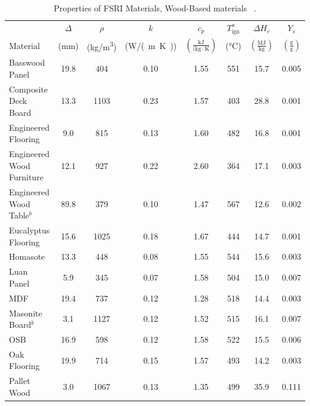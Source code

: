 \clearpage

\begin{table}[!h]
\caption[Properties of FSRI Materials, Wood-Based materials]{Properties of FSRI Materials, Wood-Based materials ~\cite{McKinnon:FSRI2023_Data}.}
\centering
\begin{tabular}{|p{4.5cm}|c|c|c|c|c|c|c|}
\hline
            & $\Delta$& $\rho$& $k$& $c_{p}$ &$T_{\mathrm{ign}}^{a}$&$\Delta H_{c}$& $Y_{s}$ \\
Material    & (mm) & (\unit{kg/m^3}) & (\unit{W/(m.K)}) & $\mathrm{\left(\frac{kJ}{(kg\cdot K}\right)}$ & (\unit{\degreeCelsius})   & $\left(\mathrm{\frac{MJ}{kg}}\right)$ & $\mathrm{\left(\frac{g}{g}\right)}$ \\ \hline
\hline
Basswood Panel                                    & 19.8 & 404  & 0.10 & 1.55 & 551 & 15.7 & 0.005 \\\hline
Composite Deck Board                              & 13.3 & 1103 & 0.23 & 1.57 & 403 & 28.8 & 0.001 \\\hline
Engineered Flooring                               & 9.0  & 815  & 0.13 & 1.60 & 482 & 16.8 & 0.001 \\\hline
Engineered Wood Furniture                         & 12.1 & 927  & 0.22 & 2.60 & 364 & 17.1 & 0.003 \\\hline
Engineered Wood Table$^{b}$                       & 89.8 & 379  & 0.10 & 1.47 & 567 & 12.6 & 0.002 \\\hline
Eucalyptus Flooring                               & 15.6 & 1025 & 0.18 & 1.67 & 444 & 14.7 & 0.001 \\\hline
Homasote                                          & 13.3 & 448  & 0.08 & 1.55 & 544 & 15.6 & 0.003 \\\hline
Luan Panel                                        & 5.9  & 345  & 0.07 & 1.58 & 504 & 15.0 & 0.007 \\\hline
MDF                                               & 19.4 & 737  & 0.12 & 1.28 & 518 & 14.4 & 0.003 \\\hline
Masonite Board$^{b}$                              & 3.1  & 1127 & 0.12 & 1.52 & 515 & 16.1 & 0.007 \\\hline
OSB                                               & 16.9 & 598  & 0.12 & 1.58 & 522 & 15.5 & 0.006 \\\hline
Oak Flooring                                      & 19.9 & 714  & 0.15 & 1.57 & 493 & 14.2 & 0.003 \\\hline
Pallet Wood                                       & 3.0  & 1067 & 0.13 & 1.35 & 499 & 35.9 & 0.111 \\\hline

\end{tabular}
\end{table}
